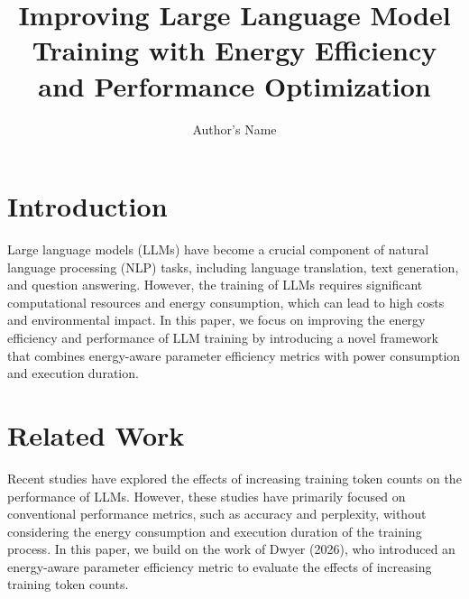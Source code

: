\documentclass{article}
\begin{document}
\title{Improving Large Language Model Training with Energy Efficiency and Performance Optimization}

\author{Author's Name}

\maketitle


\section{Introduction}

Large language models (LLMs) have become a crucial component of natural language processing (NLP) tasks, including language translation, text generation, and question answering. However, the training of LLMs requires significant computational resources and energy consumption, which can lead to high costs and environmental impact. In this paper, we focus on improving the energy efficiency and performance of LLM training by introducing a novel framework that combines energy-aware parameter efficiency metrics with power consumption and execution duration.

\section{Related Work}

Recent studies have explored the effects of increasing training token counts on the performance of LLMs. However, these studies have primarily focused on conventional performance metrics, such as accuracy and perplexity, without considering the energy consumption and execution duration of the training process. In this paper, we build on the work of Dwyer (2026), who introduced an energy-aware parameter efficiency metric to evaluate the effects of increasing training token counts.
\end{document}
